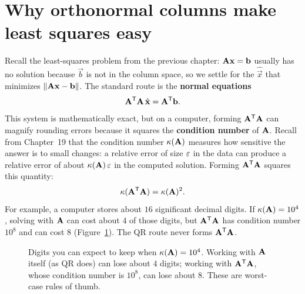 \section{Why orthonormal columns make least squares easy}

Recall the least-squares problem from the previous chapter: $\mathbf{A}\mathbf{x}=\mathbf{b}$
usually has no solution because $\vec{b}$ is not in the column space, so we settle for
the $\hat{\vec{x}}$ that minimizes $\lVert\mathbf{A}\mathbf{x}-\mathbf{b}\rVert$. The standard route
is the \textbf{normal equations}
\[
  \mathbf{A}^{\mathsf{T}}\mathbf{A}\,\hat{\mathbf{x}} = \mathbf{A}^{\mathsf{T}}\mathbf{b}.
\]
This system is mathematically exact, but on a computer, forming $\mathbf{A}^{\mathsf{T}}\mathbf{A}$ can
magnify rounding errors because it squares the \textbf{condition number} of $\mathbf{A}$.
Recall from Chapter~19 that the condition number $\kappa(\mathbf{A})$ measures how sensitive
the answer is to small changes: a relative error of size $\varepsilon$ in the data can produce a
relative error of about $\kappa(\mathbf{A})\,\varepsilon$ in the computed solution. Forming
$\mathbf{A}^{\mathsf{T}}\mathbf{A}$ squares this quantity:
\[
  \kappa(\mathbf{A}^{\mathsf{T}}\mathbf{A}) = \kappa(\mathbf{A})^2.
\]
For example, a computer stores about $16$ significant decimal digits. If
$\kappa(\mathbf{A}) = 10^4$, solving with $\mathbf{A}$ can cost about $4$ of those digits, but
$\mathbf{A}^{\mathsf{T}}\mathbf{A}$ has condition number $10^8$ and can cost $8$
(Figure~\ref{ch20:digits}). The QR route never forms $\mathbf{A}^{\mathsf{T}}\mathbf{A}$.

\begin{figure}[htbp]
\centering
{}
\caption{Digits you can expect to keep when $\kappa(\mathbf{A})=10^4$. Working with $\mathbf{A}$ itself
(as QR does) can lose about $4$ digits; working with $\mathbf{A}^{\mathsf{T}}\mathbf{A}$, whose condition number is
$10^8$, can lose about $8$. These are worst-case rules of thumb.}
\label{ch20:digits}
\end{figure}

